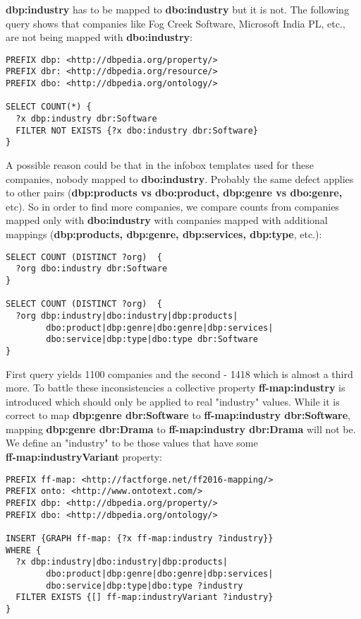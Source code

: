 \begin{enumerate}
    \textbf{dbp:industry} has to be mapped to \textbf{dbo:industry} but it is not. The following query shows that companies like Fog Creek Software, Microsoft India PL, etc., are not being mapped with \textbf{dbo:industry}:

\begin{verbatim}
PREFIX dbp: <http://dbpedia.org/property/>
PREFIX dbr: <http://dbpedia.org/resource/>
PREFIX dbo: <http://dbpedia.org/ontology/>

SELECT COUNT(*) {
  ?x dbp:industry dbr:Software
  FILTER NOT EXISTS {?x dbo:industry dbr:Software}
}
\end{verbatim}
    A possible reason could be that in the infobox templates used for these companies, nobody mapped to \textbf{dbo:industry}. Probably the same defect applies to other pairs (\textbf{dbp:products vs dbo:product, dbp:genre vs dbo:genre,} etc). So in order to find more companies, we compare counts from companies mapped only with \textbf{dbo:industry} with companies mapped with additional mappings (\textbf{dbp:products, dbp:genre, dbp:services, dbp:type}, etc.):

\begin{verbatim}
SELECT COUNT (DISTINCT ?org)  {
  ?org dbo:industry dbr:Software
}

SELECT COUNT (DISTINCT ?org)  {
  ?org dbp:industry|dbo:industry|dbp:products|
        dbo:product|dbp:genre|dbo:genre|dbp:services|
        dbo:service|dbp:type|dbo:type dbr:Software
}
\end{verbatim}
    First query yields 1100 companies and the second - 1418 which is almost a third more. To battle these inconsistencies a collective property \textbf{ff-map:industry} is introduced which should only be applied to real "industry" values. While it is correct to map \textbf{dbp:genre dbr:Software} to \textbf{ff-map:industry dbr:Software}, mapping \textbf{dbp:genre dbr:Drama} to \textbf{ff-map:industry dbr:Drama} will not be. We define an "industry" to be those values that have some \\ \textbf{ff-map:industryVariant} property:

\begin{verbatim}
PREFIX ff-map: <http://factforge.net/ff2016-mapping/>
PREFIX onto: <http://www.ontotext.com/>
PREFIX dbp: <http://dbpedia.org/property/>
PREFIX dbo: <http://dbpedia.org/ontology/>

INSERT {GRAPH ff-map: {?x ff-map:industry ?industry}}
WHERE {
  ?x dbp:industry|dbo:industry|dbp:products|
        dbo:product|dbp:genre|dbo:genre|dbp:services|
        dbo:service|dbp:type|dbo:type ?industry
  FILTER EXISTS {[] ff-map:industryVariant ?industry}
}
\end{verbatim}


\end{enumerate}

